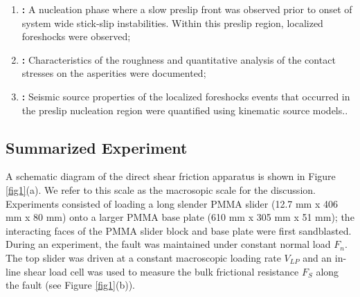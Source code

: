 \documentclass[preprint,1p, 10pt,authoryear]{elsarticle}
\begin{document}
\begin{enumerate}
\item \textbf{\citet{Selvadurai2015}: } A nucleation phase where a slow preslip front was observed prior to onset of system wide stick-slip instabilities. Within this preslip region, localized foreshocks were observed;
\item \textbf{\citet{Selvadurai2017}:} Characteristics of the roughness and quantitative analysis of the contact stresses on the asperities were documented;
\item \textbf{\citet{Selvadurai2019}: }Seismic source properties of the localized foreshocks events that occurred in the preslip nucleation region were quantified using kinematic source models..
\end{enumerate}

\subsection{Summarized Experiment}
\label{GeneralExp}
A schematic diagram of the direct shear friction apparatus is shown in Figure \ref{fig1}(a). We refer to this scale as the macrosopic scale for the discussion. Experiments consisted of loading a long slender PMMA slider (12.7 mm x 406 mm x 80 mm) onto a larger PMMA base plate (610 mm x 305 mm x 51 mm); the interacting faces of the PMMA slider block and base plate were first sandblasted. During an experiment, the fault was maintained under constant normal load $F_{n}$.  The top slider was driven at a constant macroscopic loading rate $V_{LP}$ and an in-line shear load cell was used to measure the bulk frictional resistance $F_{S}$ along the fault (see Figure \ref{fig1}(b)).   
  
\end{document}
